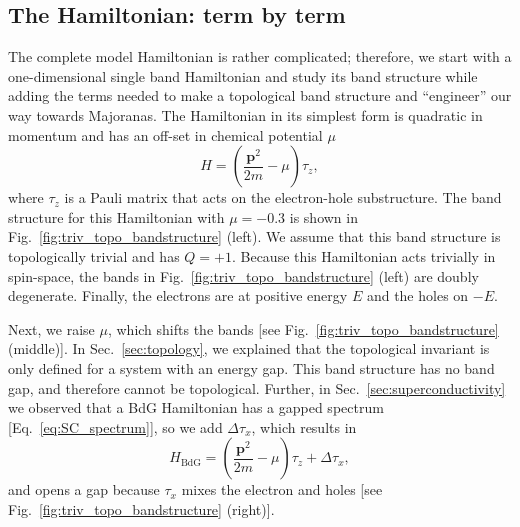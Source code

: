 \subsection{The Hamiltonian: term by term}\label{sec:hamiltonian_term_by_term}
The complete model Hamiltonian is rather complicated; therefore, we start with a one-dimensional single band Hamiltonian and study its band structure while adding the terms needed to make a topological band structure and ``engineer'' our way towards Majoranas.
The Hamiltonian in its simplest form is quadratic in momentum and has an off-set in chemical potential $\mu$
\begin{equation}
H=\left(\frac{\bm{p}^{2}}{2m}-\mu\right)\tau_{z},\label{eq:simple_ham}
\end{equation}
where $\tau_{z}$ is a Pauli matrix that acts on the electron-hole substructure.
The band structure for this Hamiltonian with $\mu=-0.3$ is shown in Fig.~\ref{fig:triv_topo_bandstructure} (left).
We assume that this band structure is topologically trivial and has $Q=+1$.
Because this Hamiltonian acts trivially in spin-space, the bands in Fig.~\ref{fig:triv_topo_bandstructure} (left) are doubly degenerate.
Finally, the electrons are at positive energy $E$ and the holes on $-E$.

Next, we raise $\mu$, which shifts the bands [see Fig.~\ref{fig:triv_topo_bandstructure} (middle)].
In Sec.~\ref{sec:topology}, we explained that the topological invariant is only defined for a system with an energy gap.
This band structure has no band gap, and therefore cannot be topological.
Further, in Sec.~\ref{sec:superconductivity} we observed that a BdG Hamiltonian has a gapped spectrum [Eq.~\eqref{eq:SC_spectrum}], so we add $\Delta\tau_{x}$, which results in
\begin{equation}
H_{\textrm{BdG}}=\left(\frac{\bm{p}^{2}}{2m}-\mu\right)\tau_{z}+\Delta\tau_{x},
\end{equation}
and opens a gap because $\tau_{x}$ mixes the electron and holes [see Fig.~\ref{fig:triv_topo_bandstructure} (right)].

